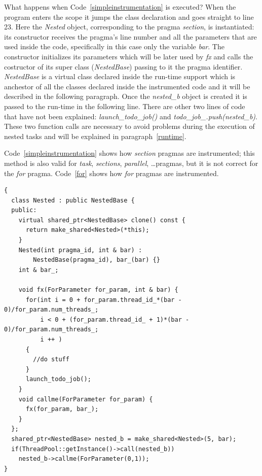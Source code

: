 \documentclass[a4paper,12pt,oneside]{book}
\begin{document}
What happens when Code~\ref{simpleinstrumentation} is executed? When the program enters the scope it jumps the class declaration and goes straight to line 23. Here the \emph{Nested} object, corresponding to the pragma \emph{section}, is instantiated: its constructor receives the pragma’s line number and all the parameters that are used inside the code, specifically in this case only the variable \emph{bar}. The constructor initializes its parameters which will be later used by \emph{fx} and calls the costructor of its super class (\emph{NestedBase}) passing to it the pragma identifier.  \emph{NestedBase} is a virtual class declared inside the run-time support which is anchestor of all the classes declared inside the instrumented code and it will be described in the following paragraph. Once the \emph{nested\_b} object is created it is passed to the run-time in the following line. There are other two lines of code that have not been explained: \emph{launch\_todo\_job()} and \emph{todo\_job\_.push(nested\_b)}. These two function calls are necessary to avoid problems during the execution of nested tasks and will be explained in paragraph~\ref{runtime}.

Code~\ref{simpleinstrumentation} shows how \emph{section} pragmas are instrumented; this method is also valid for \emph{task}, \emph{sections}, \emph{parallel}, \dots pragmas, but it is not correct for the \emph{for} pragma. Code~\ref{for} shows how \emph{for} pragmas are instrumented.

\begin{lstlisting}[language=CCC, caption=Example of an instrumented \emph{for} pragma from Code~\ref{code}., label=for]
{
  class Nested : public NestedBase {
  public: 
    virtual shared_ptr<NestedBase> clone() const { 
      return make_shared<Nested>(*this);
    } 
    Nested(int pragma_id, int & bar) : 
        NestedBase(pragma_id), bar_(bar) {}
    int & bar_;

    void fx(ForParameter for_param, int & bar) {
      for(int i = 0 + for_param.thread_id_*(bar - 0)/for_param.num_threads_; 
          i < 0 + (for_param.thread_id_ + 1)*(bar - 0)/for_param.num_threads_; 
          i ++ )
      {
        //do stuff
      }  
      launch_todo_job(); 
    }
    void callme(ForParameter for_param) {
      fx(for_param, bar_);
    }
  };
  shared_ptr<NestedBase> nested_b = make_shared<Nested>(5, bar);
  if(ThreadPool::getInstance()->call(nested_b)) 
    nested_b->callme(ForParameter(0,1));
}
\end{lstlisting}
\end{document}
